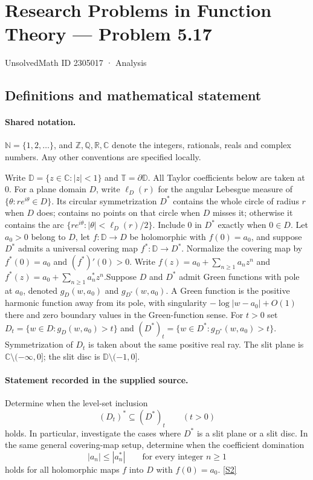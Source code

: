 \documentclass[11pt]{article}
\newcommand{\sref}[2]{\hyperlink{source:#1:#2}{[S#2]}}
\begin{document}
\setcounter{section}{2305016}
\section{Research Problems in Function Theory — Problem 5.17}\label{2305017}
{\small\sffamily UnsolvedMath ID 2305017 · Analysis}
\subsection{Definitions and mathematical statement}

\paragraph{Shared notation.}$\mathbb N=\{1,2,\ldots\}$, and $\mathbb Z,\mathbb Q,\mathbb R,\mathbb C$ denote the integers, rationals, reals and complex numbers. Any other conventions are specified locally.


Write $\mathbb D=\{z\in\mathbb C:|z|<1\}$ and $\mathbb T=\partial\mathbb D$. All Taylor coefficients below are taken at $0$. For a plane domain $D$, write $\ell_D(r)$ for the angular Lebesgue measure of $\{\theta:re^{i\theta}\in D\}$. Its circular symmetrization $D^*$ contains the whole circle of radius $r$ when $D$ does; contains no points on that circle when $D$ misses it; otherwise it contains the arc $\{re^{i\theta}:|\theta|<\ell_D(r)/2\}$. Include $0$ in $D^*$ exactly when $0\in D$. Let $a_0>0$ belong to $D$, let $f:\mathbb D\to D$ be holomorphic with $f(0)=a_0$, and suppose $D^*$ admits a universal covering map $f^*:\mathbb D\to D^*$. Normalize the covering map by $f^*(0)=a_0$ and $(f^*)'(0)>0$. Write $f(z)=a_0+\sum_{n\ge1}a_nz^n$ and $f^*(z)=a_0+\sum_{n\ge1}a_n^*z^n$.Suppose $D$ and $D^*$ admit Green functions with pole at $a_0$, denoted $g_D(w,a_0)$ and $g_{D^*}(w,a_0)$. A Green function is the positive harmonic function away from its pole, with singularity $-\log|w-a_0|+O(1)$ there and zero boundary values in the Green-function sense. For $t>0$ set $D_t=\{w\in D:g_D(w,a_0)>t\}$ and $(D^*)_t=\{w\in D^*:g_{D^*}(w,a_0)>t\}$. Symmetrization of $D_t$ is taken about the same positive real ray. The slit plane is $\mathbb C\setminus(-\infty,0]$; the slit disc is $\mathbb D\setminus(-1,0]$.
\paragraph{Statement recorded in the supplied source.}
Determine when the level-set inclusion
\[(D_t)^*\subseteq(D^*)_t\qquad(t>0)\]
holds. In particular, investigate the cases where $D^*$ is a slit plane or a slit disc. In the same general covering-map setup, determine when the coefficient domination
\[|a_n|\le |a_n^*|\qquad\text{for every integer }n\ge1\]
holds for all holomorphic maps $f$ into $D$ with $f(0)=a_0$. \sref{2305017}{2}
\end{document}
